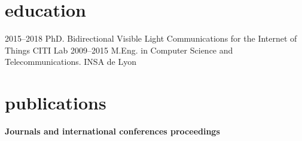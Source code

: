 \documentclass[]{cv-style}          %
\begin{document}
\pagebreak
\section{education}

\begin{entrylist}
\entry
{2015--2018}
{PhD. {\normalfont Bidirectional Visible Light Communications for the Internet of Things}}
{CITI Lab}
{}
\entry
{2009--2015}
{M.Eng. {\normalfont in Computer Science and Telecommunications.}}
{INSA de Lyon}
{ \\
}
\end{entrylist}

\section{publications}
 \vspace{-0.2cm}
\large{\textbf{Journals and international conferences proceedings}}
\end{document}
